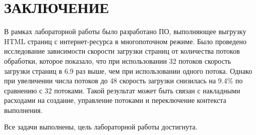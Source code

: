 \chapter*{ЗАКЛЮЧЕНИЕ}

В рамках лабораторной работы было разработано ПО, выполняющее выгрузку HTML страниц с интернет-ресурса в многопоточном режиме. Было проведено исследование зависимости скорости загрузки страниц от количества потоков обработки, которое показало, что при использовании 32 потоков скорость загрузки страниц в 6.9 раз выше, чем при использовании одного потока. Однако при увеличении числа потоков до 48 скорость загрузки снизилась на 9.4\% по сравнению с 32 потоками. Такой результат может быть связан с накладными расходами на создание, управление потоками и переключение контекста выполнения. 

Все задачи выполнены, цель лабораторной работы достигнута.

